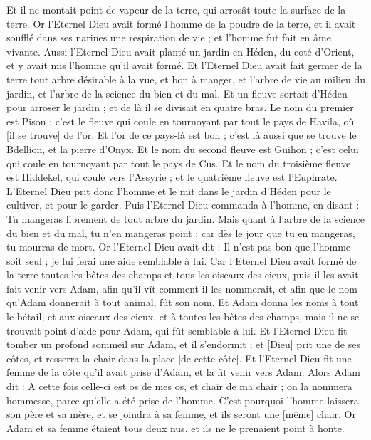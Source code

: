 \begin{multicols}{2}
Et il ne montait point de vapeur de la terre, qui arrosât toute la surface de la terre.
Or l'Eternel Dieu avait formé l'homme de la poudre de la terre, et il avait soufflé dans ses narines une respiration de vie ; et l'homme fut fait en âme vivante.
Aussi l'Eternel Dieu avait planté un jardin en Héden, du coté d'Orient, et y avait mis l'homme qu'il avait formé.
Et l'Eternel Dieu avait fait germer de la terre tout arbre désirable à la vue, et bon à manger, et l'arbre de vie au milieu du jardin, et l'arbre de la science du bien et du mal.
Et un fleuve sortait d'Héden pour arroser le jardin ; et de là il se divisait en quatre bras.
Le nom du premier est Pison ; c'est le fleuve qui coule en tournoyant par tout le pays de Havila, où [il se trouve] de l'or.
Et l'or de ce pays-là est bon ; c'est là aussi que se trouve le Bdellion, et la pierre d'Onyx.
Et le nom du second fleuve est Guihon ; c'est celui qui coule en tournoyant par tout le pays de Cus.
Et le nom du troisième fleuve est Hiddekel, qui coule vers l'Assyrie ; et le quatrième fleuve est l'Euphrate.
L'Eternel Dieu prit donc l'homme et le mit dans le jardin d'Héden pour le cultiver, et pour le garder.
Puis l'Eternel Dieu commanda à l'homme, en disant : Tu mangeras librement de tout arbre du jardin.
Mais quant à l'arbre de la science du bien et du mal, tu n'en mangeras point ; car dès le jour que tu en mangeras, tu mourras de mort.
Or l'Eternel Dieu avait dit : Il n'est pas bon que l'homme soit seul ; je lui ferai une aide semblable à lui.
Car l'Eternel Dieu avait formé de la terre toutes les bêtes des champs et tous les oiseaux des cieux, puis il les avait fait venir vers Adam, afin qu'il vît comment il les nommerait, et afin que le nom qu'Adam donnerait à tout animal, fût son nom.
Et Adam donna les noms à tout le bétail, et aux oiseaux des cieux, et à toutes les bêtes des champs, mais il ne se trouvait point d'aide pour Adam, qui fût semblable à lui.
Et l'Eternel Dieu fit tomber un profond sommeil sur Adam, et il s'endormit ; et [Dieu] prit une de ses côtes, et resserra la chair dans la place [de cette côte].
Et l'Eternel Dieu fit une femme de la côte qu'il avait prise d'Adam, et la fit venir vers Adam.
Alors Adam dit : A cette fois celle-ci est os de mes os, et chair de ma chair ; on la nommera hommesse, parce qu'elle a été prise de l'homme.
C'est pourquoi l'homme laissera son père et sa mère, et se joindra à sa femme, et ils seront une [même] chair.
Or Adam et sa femme étaient tous deux nus, et ils ne le prenaient point à honte.

\end{multicols}
